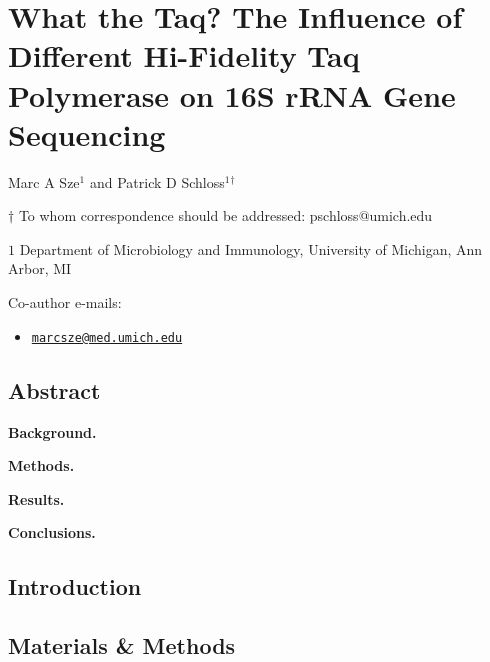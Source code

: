 \documentclass[12pt,]{article}
\title{}
\author{}
\date{}
\providecommand{\tightlist}{%
  \setlength{\itemsep}{0pt}\setlength{\parskip}{0pt}}
\begin{document}
\section{What the Taq? The Influence of Different Hi-Fidelity Taq
Polymerase on 16S rRNA Gene
Sequencing}\label{what-the-taq-the-influence-of-different-hi-fidelity-taq-polymerase-on-16s-rrna-gene-sequencing}

\begin{center}
\vspace{25mm}

Marc A Sze${^1}$ and Patrick D Schloss${^1}$${^\dagger}$

\vspace{20mm}

$\dagger$ To whom correspondence should be addressed: pschloss@umich.edu

$1$ Department of Microbiology and Immunology, University of Michigan, Ann Arbor, MI




\end{center}

Co-author e-mails:

\begin{itemize}
\tightlist
\item
  \href{mailto:marcsze@med.umich.edu}{\nolinkurl{marcsze@med.umich.edu}}
\end{itemize}

\newpage

\linenumbers

\subsection{Abstract}\label{abstract}

\textbf{Background.}

\textbf{Methods.}

\textbf{Results.}

\textbf{Conclusions.}

\newpage

\subsection{Introduction}\label{introduction}

\newpage

\subsection{Materials \& Methods}\label{materials-methods}
\end{document}
